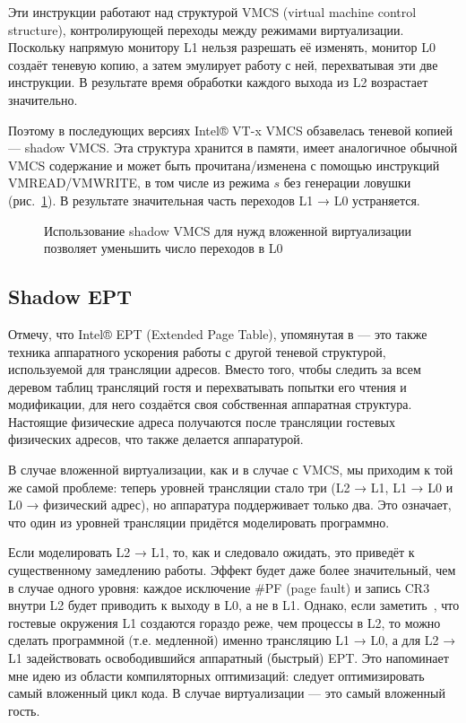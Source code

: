 Эти инструкции работают над структурой VMCS (\abbr virtual machine control structure), контролирующей переходы между режимами виртуализации. Поскольку напрямую монитору L1 нельзя разрешать её изменять, монитор L0 создаёт теневую копию, а затем эмулирует работу с ней, перехватывая эти две инструкции. В результате время обработки каждого выхода из L2 возрастает значительно.

Поэтому в последующих версиях Intel® VT-x VMCS обзавелась теневой копией — shadow VMCS. Эта структура хранится в памяти, имеет аналогичное обычной VMCS содержание и может быть прочитана/изменена с помощью инструкций VMREAD/VMWRITE, в том числе из режима $s$ без генерации ловушки (рис. \ref{fig:nested-vmread-shadow}).
В результате значительная часть переходов L1 → L0 устраняется. %


\begin{figure}[htb]
    \centering
    \caption[Использование shadow VMCS]{Использование shadow VMCS для нужд вложенной виртуализации позволяет уменьшить число переходов в L0}
    \label{fig:nested-vmread-shadow}
\end{figure}


\subsection{Shadow EPT}

Отмечу, что Intel® EPT (\abbr Extended Page Table), упомянутая в — это также техника аппаратного ускорения работы с другой теневой структурой, используемой для трансляции адресов. Вместо того, чтобы следить за всем деревом таблиц трансляций гостя и перехватывать попытки его чтения и модификации, для него создаётся своя собственная аппаратная структура. Настоящие физические адреса получаются после трансляции гостевых физических адресов, что также делается аппаратурой.

В случае вложенной виртуализации, как и в случае с VMCS, мы приходим к той же самой проблеме: теперь уровней трансляции стало три (L2 → L1, L1 → L0 и L0 → физический адрес), но аппаратура поддерживает только два. Это означает, что один из уровней трансляции придётся моделировать программно.

Если моделировать L2 → L1, то, как и следовало ожидать, это приведёт к существенному замедлению работы. Эффект будет даже более значительный, чем в случае одного уровня: каждое исключение \#PF (\abbr page fault) и запись CR3 внутри L2 будет приводить к выходу в L0, а не в L1. Однако, если заметить \cite{nested-ept-kvm-2013}, что гостевые окружения L1 создаются гораздо реже, чем процессы в L2, то можно сделать программной (т.е. медленной) именно трансляцию L1 → L0, а для L2 → L1 задействовать освободившийся аппаратный (быстрый) EPT. Это напоминает мне идею из области компиляторных оптимизаций: следует оптимизировать самый вложенный цикл кода. В случае виртуализации — это самый вложенный гость.

